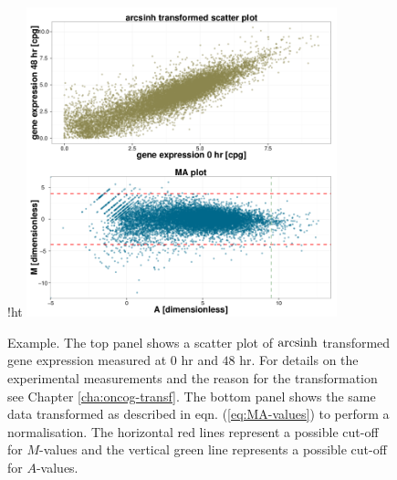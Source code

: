 \begin{figure}{!ht}
\centering
\includegraphics[width=0.8\textwidth]{pics/ma-plot.png}
\caption{Example. The top panel shows a scatter plot of $\operatorname{arcsinh}$ transformed gene expression measured at $0$ hr and $48$ hr. For details on the experimental measurements and the reason for the transformation see Chapter \ref{cha:oncog-transf}. The bottom panel shows the same data transformed as described in eqn. (\ref{eq:MA-values}) to perform a normalisation. The horizontal red lines represent a possible cut-off for $M$-values and the vertical green line represents a possible cut-off for $A$-values.}
\label{fig:ma-plot}
\end{figure}

